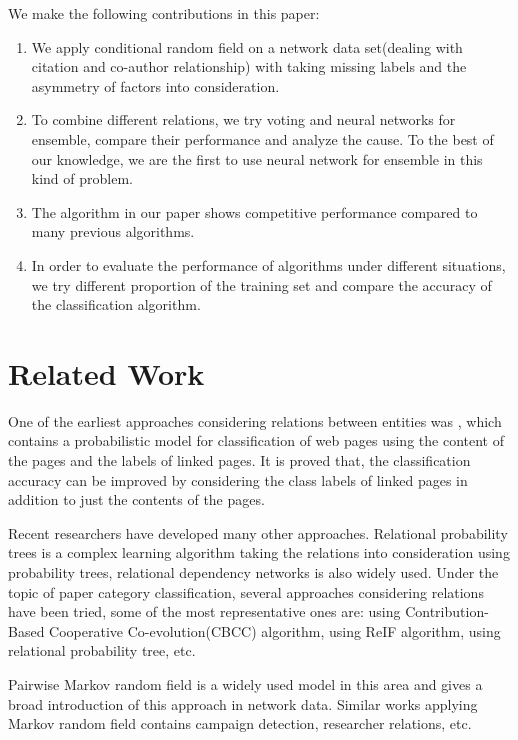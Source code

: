 \documentclass{sig-alternate}
\begin{document}
We make the following contributions in this paper:
\begin{enumerate}
    \item We apply conditional random field on a network data set(dealing with citation and co-author relationship) with taking missing labels and the asymmetry of factors into consideration.
    \item To combine different relations, we try voting and neural networks for ensemble, compare their performance and analyze the cause. To the best of our knowledge, we are the first to use neural network for ensemble in this kind of problem. 
    \item The algorithm in our paper shows competitive performance compared to many previous algorithms.
    \item In order to evaluate the performance of algorithms under different situations, we try different proportion of the training set and compare the accuracy of the classification algorithm. 
\end{enumerate}

\section{Related Work}
One of the earliest approaches considering relations between entities was \cite{Chakrabarti2002Enhanced}, which contains a probabilistic model for classification of web pages using the content of the pages and the labels of linked pages. It is proved that, the classification accuracy can be improved by considering the class labels of linked pages in addition to just the contents of the pages.

Recent researchers have developed many other approaches. Relational probability trees\cite{Neville2003Learning} is a complex learning algorithm taking the relations into consideration using probability trees\cite{Provost2000Well}, relational dependency networks\cite{neville2003collective} is also widely used. Under the topic of paper category classification, several approaches considering relations have been tried, some of the most representative ones are: \cite{mcdowell2007case} using Contribution-Based Cooperative Co-evolution(CBCC) algorithm, \cite{dinh2012link} using ReIF algorithm, \cite{neville2003collective}using relational probability tree, etc. 

Pairwise Markov random field\cite{Taskar2003Link} is a widely used model in this area and \cite{sen2008collective} gives a broad introduction of this approach in network data. Similar works applying Markov random field contains campaign detection\cite{Li2015Detecting}, researcher relations\cite{Wang2010Mining}, etc.
\end{document}
